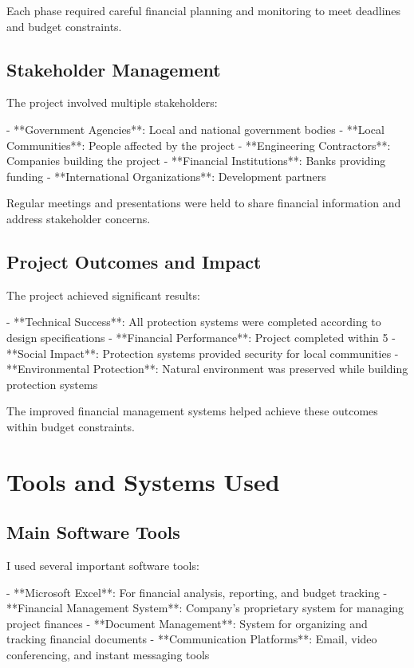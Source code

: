 Each phase required careful financial planning and monitoring to meet deadlines and budget constraints.

\subsection{Stakeholder Management}
The project involved multiple stakeholders:

- **Government Agencies**: Local and national government bodies
- **Local Communities**: People affected by the project
- **Engineering Contractors**: Companies building the project
- **Financial Institutions**: Banks providing funding
- **International Organizations**: Development partners

Regular meetings and presentations were held to share financial information and address stakeholder concerns.

\subsection{Project Outcomes and Impact}
The project achieved significant results:

- **Technical Success**: All protection systems were completed according to design specifications
- **Financial Performance**: Project completed within 5%
- **Social Impact**: Protection systems provided security for local communities
- **Environmental Protection**: Natural environment was preserved while building protection systems

The improved financial management systems helped achieve these outcomes within budget constraints.

\section{Tools and Systems Used}

\subsection{Main Software Tools}
I used several important software tools:

- **Microsoft Excel**: For financial analysis, reporting, and budget tracking
- **Financial Management System**: Company's proprietary system for managing project finances
- **Document Management**: System for organizing and tracking financial documents
- **Communication Platforms**: Email, video conferencing, and instant messaging tools

